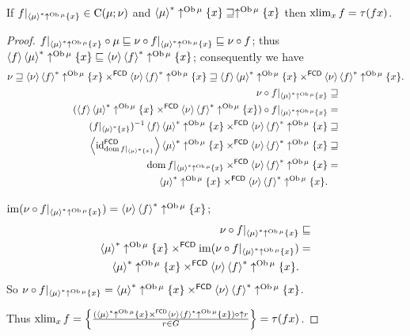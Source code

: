 \begin{thm}
If $f|_{\rsupfun{\mu}\uparrow^{\Ob\mu}\{x\}}\in\continuous(\mu;\nu)$
and $\rsupfun{\mu}\uparrow^{\Ob\mu}\{x\}\sqsupseteq\uparrow^{\Ob\mu}\{x\}$
then $\xlim_{x}f=\tau(fx)$.\end{thm}
\begin{proof}
$f|_{\rsupfun{\mu}\uparrow^{\Ob\mu}\{x\}}\circ\mu\sqsubseteq\nu\circ f|_{\rsupfun{\mu}\uparrow^{\Ob\mu}\{x\}}\sqsubseteq\nu\circ f$;
thus $\langle f\rangle\rsupfun{\mu}\uparrow^{\Ob\mu}\{x\}\sqsubseteq\supfun{\nu}\rsupfun f\uparrow^{\Ob\mu}\{x\}$;
consequently we have
\begin{gather*}
\nu\sqsupseteq\supfun{\nu}\rsupfun f\uparrow^{\Ob\mu}\{x\}\times^{\mathsf{FCD}}\supfun{\nu}\rsupfun f\uparrow^{\Ob\mu}\{x\}\sqsupseteq\supfun f\rsupfun{\mu}\uparrow^{\Ob\mu}\{x\}\times^{\mathsf{FCD}}\supfun{\nu}\rsupfun f\uparrow^{\Ob\mu}\{x\}.\\
\begin{aligned}\nu\circ f|_{\rsupfun{\mu}\uparrow^{\Ob\mu}\{x\}} & \sqsupseteq\\
(\supfun f\rsupfun{\mu}\uparrow^{\Ob\mu}\{x\}\times^{\mathsf{FCD}}\supfun{\nu}\rsupfun f\uparrow^{\Ob\mu}\{x\})\circ f|_{\rsupfun{\mu}\uparrow^{\Ob\mu}\{x\}} & =\\
(f|_{\rsupfun{\mu}\{x\}})^{-1}\supfun f\rsupfun{\mu}\uparrow^{\Ob\mu}\{x\}\times^{\mathsf{FCD}}\supfun{\nu}\rsupfun f\uparrow^{\Ob\mu}\{x\} & \sqsupseteq\\
\supfun{\id_{\dom f|_{\rsupfun{\mu}\{x\}}}^{\mathsf{FCD}}}\rsupfun{\mu}\uparrow^{\Ob\mu}\{x\}\times^{\mathsf{FCD}}\supfun{\nu}\rsupfun f\uparrow^{\Ob\mu}\{x\} & \sqsupseteq\\
\dom f|_{\rsupfun{\mu}\uparrow^{\Ob\mu}\{x\}}\times^{\mathsf{FCD}}\supfun{\nu}\rsupfun f\uparrow^{\Ob\mu}\{x\} & =\\
\rsupfun{\mu}\uparrow^{\Ob\mu}\{x\}\times^{\mathsf{FCD}}\supfun{\nu}\rsupfun f\uparrow^{\Ob\mu}\{x\}.
\end{aligned}
\end{gather*}


$\im(\nu\circ f|_{\rsupfun{\mu}\uparrow^{\Ob\mu}\{x\}})=\supfun{\nu}\rsupfun f\uparrow^{\Ob\mu}\{x\}$;
\begin{align*}
\nu\circ f|_{\rsupfun{\mu}\uparrow^{\Ob\mu}\{x\}} & \sqsubseteq\\
\rsupfun{\mu}\uparrow^{\Ob\mu}\{x\}\times^{\mathsf{FCD}}\im(\nu\circ f|_{\rsupfun{\mu}\uparrow^{\Ob\mu}\{x\}}) & =\\
\rsupfun{\mu}\uparrow^{\Ob\mu}\{x\}\times^{\mathsf{FCD}}\supfun{\nu}\rsupfun f\uparrow^{\Ob\mu}\{x\}.
\end{align*}
So $\nu\circ f|_{\rsupfun{\mu}\uparrow^{\Ob\mu}\{x\}}=\rsupfun{\mu}\uparrow^{\Ob\mu}\{x\}\times^{\mathsf{FCD}}\supfun{\nu}\rsupfun f\uparrow^{\Ob\mu}\{x\}$.

Thus $\xlim_{x}f=\setcond{(\rsupfun{\mu}\uparrow^{\Ob\mu}\{x\}\times^{\mathsf{FCD}}\supfun{\nu}\rsupfun f\uparrow^{\Ob\mu}\{x\})\circ\uparrow r}{r\in G}=\tau(fx)$.\end{proof}
